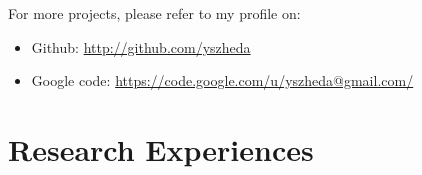 \documentclass[letterpaper]{article}
\begin{document}
\begin{itemize}
\end{itemize}

For more projects, please refer to my profile on:
\begin{itemize}
  \item Github: \url{http://github.com/yszheda} 
  \item Google code: \url{https://code.google.com/u/yszheda@gmail.com/}
\end{itemize}


\section*{Research Experiences}
\end{document}
